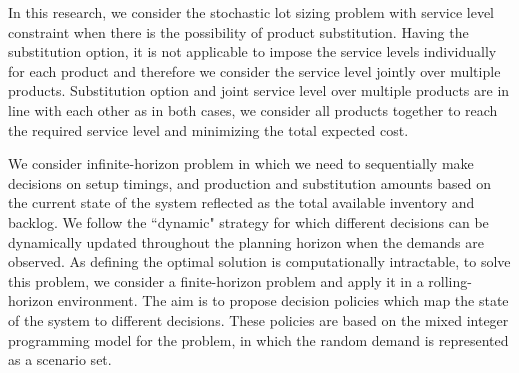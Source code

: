 \documentclass[10pt]{article}
\begin{document}
In this research, we consider the stochastic lot sizing problem with service level constraint when there is the possibility of product substitution. Having the substitution option, it is not applicable to impose the service levels individually for each product and therefore we consider the service level jointly over multiple products. Substitution option and joint service level over multiple products are in line with each other as in both cases, we consider all products together to reach the required service level and minimizing the total expected cost. 



We consider infinite-horizon problem in which we need to sequentially make decisions on setup timings, and production and substitution amounts based on the current state of the system reflected as the total available inventory and backlog. We follow the ``dynamic" strategy \cite{bookbinder1988strategies} for which different decisions can be dynamically updated throughout the planning horizon when the demands are observed. As defining the optimal solution is computationally intractable, to solve this problem, we consider a finite-horizon problem and apply it in a rolling-horizon environment. The aim is to propose decision policies which map the state of the system to different decisions. These policies are based on the mixed integer programming model for the problem, in which the random demand is represented as a scenario set.
\end{document}
